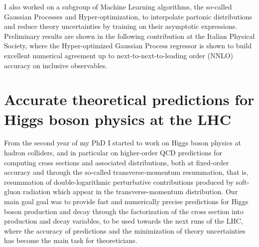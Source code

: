 \documentclass[12pt]{article}
\begin{document}
I also worked on a subgroup of Machine Learning algorithms, the so-called Gaussian Processes and Hyper-optimization, to interpolate partonic distributions and reduce theory uncertainties by training on their asymptotic expressions. Preliminary results are shown in the following contribution at the Italian Physical Society, where the Hyper-optimized Gaussian Process regressor is shown to build excellent numerical agreement up to next-to-next-to-leading order (NNLO) accuracy on inclusive observables.

\section{Accurate theoretical predictions for Higgs boson physics at the LHC}

From the second year of my PhD I started to work on Higgs boson physics at hadron colliders, and in particular on higher-order QCD predictions for computing cross sections and associated distributions, both at fixed-order accuracy and through the so-called transverse-momentum resummation, that is, resummation of double-logarithmic perturbative contributions produced by soft-gluon radiation which appear in the transverse-momentum distribution. Our main goal goal was to provide fast and numerically precise predictions for Higgs boson production and decay through the factorization of the cross section into production and decay variables, to be used towards the next runs of the LHC, where the accuracy of predictions and the minimization of theory uncertainties has become the main task for theoreticians. \\
\end{document}
